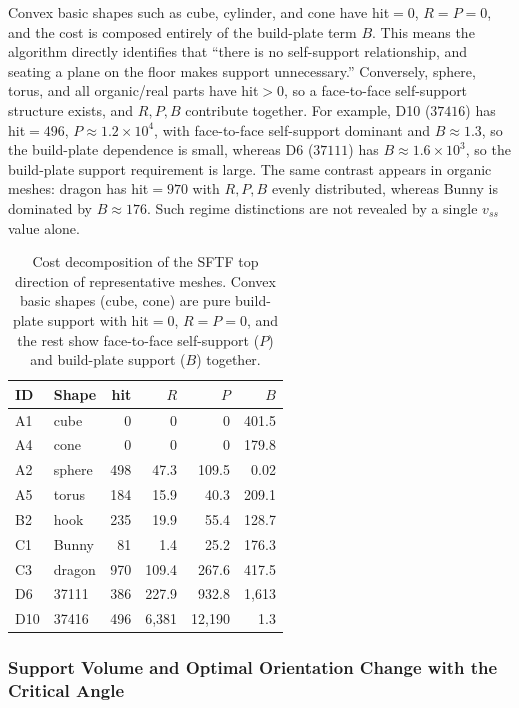 \documentclass[11pt,a4paper]{article}
\begin{document}
Convex basic shapes such as cube, cylinder, and cone have hit$=0$, $R=P=0$, and the cost is
composed entirely of the build-plate term $B$.
This means the algorithm directly identifies that ``there is no self-support relationship, and seating a plane on the floor makes support unnecessary.''
Conversely, sphere, torus, and all organic/real parts have hit$>0$, so a face-to-face self-support structure exists,
and $R,P,B$ contribute together.
For example, D10 ($37416$) has hit$=496$, $P\approx1.2\times10^4$, with face-to-face self-support dominant
and $B\approx1.3$, so the build-plate dependence is small, whereas
D6 ($37111$) has $B\approx1.6\times10^3$, so the build-plate support requirement is large.
The same contrast appears in organic meshes: dragon has hit$=970$ with $R,P,B$ evenly distributed, whereas
Bunny is dominated by $B\approx176$.
Such regime distinctions are not revealed by a single $v_{ss}$ value alone.

\begin{table}[H]
\centering
\caption{Cost decomposition of the SFTF top direction of representative meshes.
Convex basic shapes (cube, cone) are pure build-plate support with hit$=0$, $R=P=0$,
and the rest show face-to-face self-support ($P$) and build-plate support ($B$) together.}
\label{tab:fivegroup-structure}
\begin{tabular}{llrrrr}
\toprule
ID & Shape & hit & $R$ & $P$ & $B$\\
\midrule
A1  & cube     & 0   & 0       & 0        & 401.5\\
A4  & cone     & 0   & 0       & 0        & 179.8\\
A2  & sphere   & 498 & 47.3    & 109.5    & 0.02\\
A5  & torus    & 184 & 15.9    & 40.3     & 209.1\\
B2  & hook     & 235 & 19.9    & 55.4     & 128.7\\
C1  & Bunny    & 81  & 1.4     & 25.2     & 176.3\\
C3  & dragon   & 970 & 109.4   & 267.6    & 417.5\\
D6  & 37111    & 386 & 227.9   & 932.8    & 1{,}613\\
D10 & 37416    & 496 & 6{,}381 & 12{,}190 & 1.3\\
\bottomrule
\end{tabular}
\end{table}

\subsubsection{Support Volume and Optimal Orientation Change with the Critical Angle}
\label{sec:critangle}
\end{document}
